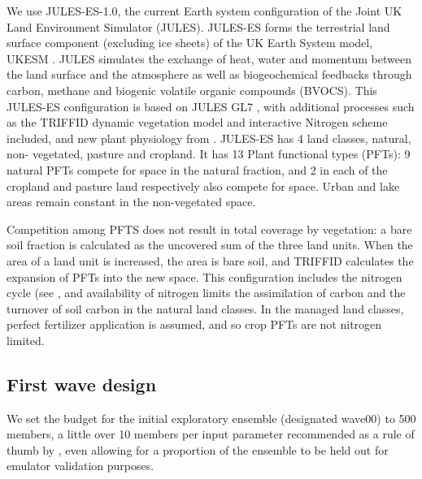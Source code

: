 \documentclass[gmd, manuscript]{copernicus}
\begin{document}
We use JULES-ES-1.0, the current Earth system configuration of the Joint UK Land Environment Simulator (JULES). JULES-ES forms the terrestrial land surface component (excluding ice sheets) of the UK Earth System model, UKESM \citep{sellar2019UKESM}. JULES simulates the exchange of heat, water and momentum between the land surface and the atmosphere as well as biogeochemical feedbacks through carbon, methane and biogenic volatile organic compounds (BVOCS). This JULES-ES configuration is based on JULES GL7 \citep{wiltshire2020jules}, with additional processes such as the TRIFFID dynamic vegetation model \citep{cox2001description} and interactive Nitrogen scheme \citep{wiltshire2021julescn} included, and new plant physiology from \cite{harper2018vegetation}. JULES-ES has 4 land classes, natural, non- vegetated, pasture and cropland. It has 13 Plant functional types (PFTs): 9 natural PFTs compete for space in the natural fraction, and 2 in each of the cropland and pasture land respectively also compete for space. Urban and lake areas remain constant in the non-vegetated space.

Competition among PFTS does not result in total coverage by vegetation: a bare soil fraction is calculated as the uncovered sum of the three land units. When the area of a land unit is increased, the area is bare soil, and TRIFFID calculates the expansion of PFTs into the new space. This configuration includes the nitrogen cycle (see \citep{wiltshire2021julescn}, and availability of nitrogen limits the assimilation of carbon and the turnover of soil carbon in the natural land classes. In the managed land classes, perfect fertilizer application is assumed, and so crop PFTs are not nitrogen limited.

\subsection{First wave design}\label{ssec:first_wave_design}

We set the budget for the initial exploratory ensemble (designated wave00) to 500 members, a little over 10 members per input parameter recommended as a rule of thumb by \cite{loeppky2012choosing}, even allowing for a proportion of the ensemble to be held out for emulator validation purposes.
\end{document}
